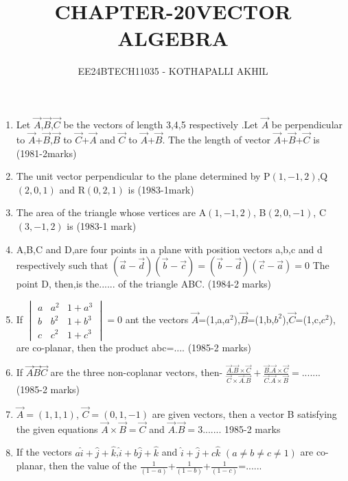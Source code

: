 \documentclass[journal,12pt,twocolumn]{IEEEtran}
\theoremstyle{remark}
\begin{document}

\vspace{3cm}
\title{CHAPTER-20}
\title{VECTOR ALGEBRA}
\author{EE24BTECH11035 - KOTHAPALLI AKHIL}
\maketitle
\newpage
\bigskip
{}
\begin{enumerate}
    \item Let $\Vec{A}$,$\vec{B}$,$\vec{C}$ be the vectors of length 3,4,5 respectively .Let $\vec{A}$ be perpendicular to $\vec{A}$+$\vec{B}$,$\vec{B}$ to $\vec{C}$+$\vec{A}$ and $\vec{C}$ to $\vec{A}$+$\vec{B}$. The the length of vector $\vec{A}$+$\vec{B}$+$\vec{C}$ is
    \hfill{(1981-2marks)}
    \item The unit vector perpendicular to the plane determined by P$(1,-1,2)$,Q$(2,0,1)$ and R$(0,2,1)$ is
    \hfill{(1983-1mark)}
    \item The area of the triangle whose vertices are A$(1,-1,2)$, B$(2,0,-1)$, C$(3,-1,2)$ is
    \hfill{(1983-1 mark)}
    \item A,B,C and D,are four points in a plane with position vectors a,b,c and d respectively such that $(\vec{a}-\vec{d})(\vec{b}-\vec{c})=(\vec{b}-\vec{d})(\vec{c}-\vec{a})=0$
    The point D, then,is the...... of the triangle ABC.
    \hfill{(1984-2 marks)}
    \item If $ 
 \begin{vmatrix}
a & a^2 & 1+a^3\\
b & b^2 & 1+b^3\\
c & c^2 & 1+c^3
\end{vmatrix}
=0$ ant the vectors $\vec{A}$=(1,a,$a^2$),$\vec{B}$=(1,b,$b^2$),$\vec{C}$=(1,c,$c^2$), are co-planar, then the product abc=....
\hfill{(1985-2 marks)}
\item If $\vec{A}$$\vec{B}$$\vec{C}$ are the three non-coplanar vectors, then- $\frac{\vec{A}.\vec{B}\times\vec{C}}{\vec{C}\times\vec{A}.\vec{B}}+\frac{\vec{B}.\vec{A}\times\vec{C}}{\vec{C}.\vec{A}\times\vec{B}}=$.......
\hfill{(1985-2 marks)}
\item $\vec{A}=(1,1,1)$, $\vec{C}=(0,1,-1)$ are given vectors, then a vector B satisfying the given equations $\vec{A}\times\vec{B}=\vec{C}$ and $\vec{A}.\vec{B}=3$.......
\hfill{1985-2 marks}
\item If the vectors $a\hat{i}+\hat{j}+\hat{k}$,$\hat{i}+b\hat{j}+\hat{k}$ and $\hat{i}+\hat{j}+c\hat{k}$ $(a\neq b\neq c\neq 1)$ are co-planar, then the value of the $\frac{1}{(1-a)}$+$\frac{1}{(1-b)}$+$\frac{1}{(1-c)}$=......

\end{enumerate}
\end{document}
